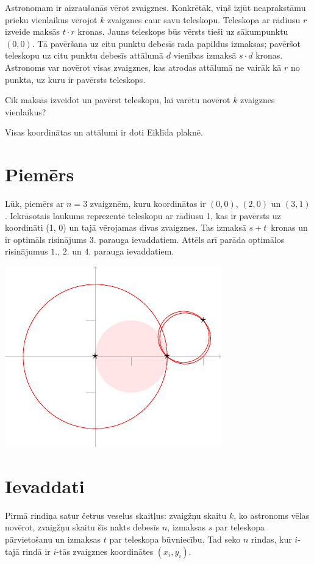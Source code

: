 

\noindent
Astronomam ir aizraušanās vērot zvaigznes.
Konkrētāk, viņš izjūt neaprakstāmu prieku vienlaikus vērojot $k$ zvaigznes caur savu teleskopu.
Teleskopa ar rādiusu $r$ izveide maksās $t\cdot r$ kronas.
Jauns teleskops būs vērsts tieši uz sākumpunktu $(0,0)$.
Tā pavēršana uz citu punktu debesīs rada papildus izmaksas;
pavēršot teleskopu uz citu punktu debesīs attālumā $d$ vienības izmaksā $s\cdot d$ kronas.
Astronoms var novērot visas zvaigznes, kas atrodas attālumā ne vairāk kā $r$ no punkta, uz kuru ir pavērsts teleskops.

Cik maksās izveidot un pavērst teleskopu, lai varētu novērot $k$ zvaigznes vienlaikus?

\medskip

Visas koordinātas un attālumi ir doti Eiklīda plaknē.

\section*{Piemērs}

Lūk, piemērs ar $n=3$ zvaigznēm, kuru koordinātas ir $(0,0)$, $(2,0)$ un $(3,1)$.
Iekrāsotais laukums reprezentē teleskopu ar rādiusu 1, kas ir pavērsts uz koordināti (1, 0) un
tajā vērojamas divas zvaigznes. Tas izmaksā $s + t$~kronas un ir optimāls risinājums $3$. parauga ievaddatiem.
Attēls arī parāda optimālos risinājumus $1.$, $2.$ un $4.$ parauga ievaddatiem.

\medskip
\noindent
\includegraphics[width=.3\textwidth]{img/samples.pdf}

\section*{Ievaddati}

Pirmā rindiņa satur četrus veselus skaitļus:
zvaigžņu skaitu $k$, ko astronoms vēlas novērot,
zvaigžņu skaitu šīs nakts debesīs $n$,
izmaksas $s$ par teleskopa pārvietošanu un
izmaksas $t$ par teleskopa būvniecību.
Tad seko $n$ rindas, kur $i$-tajā rindā ir $i$-tās zvaigznes koordinātes $(x_i,y_i)$.

